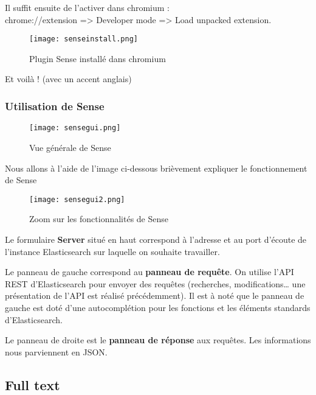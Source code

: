 Il suffit ensuite de l'activer dans chromium :\\ 
chrome://extension => Developer mode => Load unpacked extension.
\begin{figure}[H]
\center
\texttt{[image: senseinstall.png]}
\label{fig:senseinstall}
\caption{Plugin Sense installé dans chromium}
\end{figure}
Et voilà ! \footnotesize{(avec un accent anglais)}
\subsubsection{Utilisation de Sense}

\begin{figure}[H]
\center
\texttt{[image: sensegui.png]}
\label{fig:sensegui}
\caption{Vue générale de Sense}
\end{figure}

Nous allons à l'aide de l'image ci-dessous brièvement expliquer le fonctionnement de Sense
\begin{figure}[H]
\center
\texttt{[image: sensegui2.png]}
\label{fig:sensegui2.png}
\caption{Zoom sur les fonctionnalités de Sense}
\end{figure}
Le formulaire \textbf{Server} situé en haut correspond à l'adresse et au port d'écoute 
de l'instance Elasticsearch sur laquelle on souhaite travailler.

Le panneau de gauche correspond au \textbf{panneau de requête}. On utilise l'API 
REST d'Elasticsearch pour envoyer des requêtes (recherches, modifications\ldots 
une présentation de l'API est réalisé précédemment). Il est à noté que le panneau 
de gauche est doté d'une autocomplétion pour les fonctions et les éléments standards 
d'Elasticsearch.

Le panneau de droite est le \textbf{panneau de réponse} aux requêtes. Les informations
nous parviennent en JSON.

\subsection{Full text}
\label{subsec:elasticfulltext}

